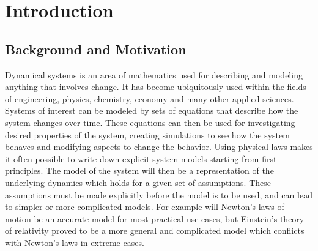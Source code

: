 \chapter{Introduction} \label{cpt:intro}


\section{Background and Motivation}\label{sec:background}

Dynamical systems is an area of mathematics used for describing and modeling anything that involves change. It has become ubiquitously used within the fields of engineering, physics, chemistry, economy and many other applied sciences. Systems of interest can be modeled by sets of equations that describe how the system changes over time. These equations can then be used for investigating desired properties of the system, creating simulations to see how the system behaves and modifying aspects to change the behavior. Using physical laws makes it often possible to write down explicit system models starting from first principles. The model of the system will then be a representation of the underlying dynamics which holds for a given set of assumptions. These assumptions must be made explicitly before the model is to be used, and can lead to simpler or more complicated models. For example will Newton's laws of motion be an accurate model for most practical use cases, but Einstein's theory of relativity proved to be a more general and complicated model which conflicts with Newton's laws in extreme cases.

